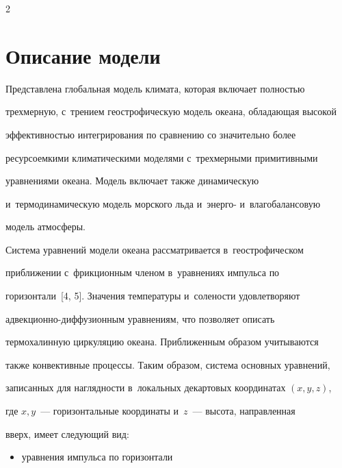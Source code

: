 \begin{multicols}{2}
\vspace*{-3pt}


  


\section{Описание модели}





\vspace*{-2pt}





  Представлена глобальная модель климата, которая включает полностью 


трехмерную, с~трением геострофическую модель океана, обладающая высокой 


эффективностью интегрирования по сравнению со значительно более 


ресурсоемкими климатическими моделями с~трехмерными примитивными 


уравнениями океана. Модель включает также динамическую 


и~термодинамическую модель морского льда и~энерго- и~влагобалансовую 


модель ат\-мо\-сферы.


  


  Система уравнений модели океана рассматривается в~геострофическом 


приближении с~фрикционным членом в~уравнениях импульса по 


горизон\-тали~[4, 5]. Значения температуры и~солености удовле\-творяют  


ад\-век\-ци\-он\-но-диф\-фу\-зи\-он\-ным уравнениям, что позволяет описать 


термохалинную циркуляцию океана. Приближенным образом учитываются 


также конвективные процессы. Таким образом, система основных уравнений, 


записанных для наглядности в~локальных декартовых координатах $(x, y, z)$, 


где $x, y$~--- горизонтальные координаты и~$z$~--- высота, направленная 


вверх, имеет следующий вид:


  \begin{itemize}


  \item уравнения импульса по горизонтали



\end{itemize}
\end{multicols}
